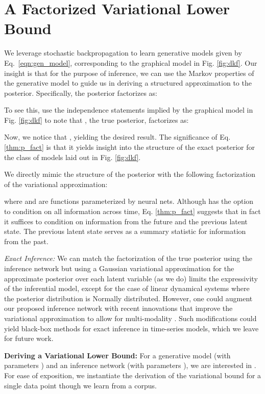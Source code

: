 \documentclass[letterpaper]{article}
\theoremstyle{plain}
\begin{document}
 \section{A Factorized Variational Lower Bound \label{sec:learnmodel}}

We leverage stochastic backpropagation to learn generative models given by 
Eq.~\ref{eqn:gen_model}, corresponding to the graphical model in Fig. \ref{fig:dkf}.
Our insight is that for the purpose of inference, we can use the Markov properties of
the generative model to guide us in deriving a structured
approximation to the posterior. Specifically, the posterior factorizes as:

To see this, use the independence statements implied by the graphical
model in Fig. \ref{fig:dkf}
 to note that , the true posterior, factorizes as:
	
Now, we notice that , yielding the desired result.
The significance of Eq. \ref{thm:p_fact} is that it yields 
insight into the structure of the exact posterior for the class of models
laid out in Fig. \ref{fig:dkf}. 

We directly mimic the structure of the posterior with the following factorization of the variational approximation:

where  and  are functions parameterized by neural nets.
Although  has the option to condition on all information across time, Eq. \ref{thm:p_fact}
suggests that in fact it suffices to condition on information from the future
and the previous latent state. The previous latent state serves as a summary statistic for information from the past.

\textit{Exact Inference: } We can match the factorization of the true posterior using the inference network
but using a Gaussian variational approximation for the approximate posterior over each latent variable (as we do) limits the expressivity
of the inferential model, except for the case of linear dynamical
systems where the posterior distribution is Normally distributed.
However, one could augment our proposed inference network with recent innovations that improve the variational
approximation to allow for multi-modality \cite{rezende2015variational,tran2016variational}. Such modifications could yield black-box 
methods for exact inference in time-series models, which we leave for future work. 


{\bf Deriving a Variational Lower Bound:} 
For a generative model (with parameters ) and an inference network (with parameters ), we are interested in 
. For ease of exposition, we instantiate the derivation of the variational bound for a single data point 
though we learn  from a corpus. 
\end{document}
